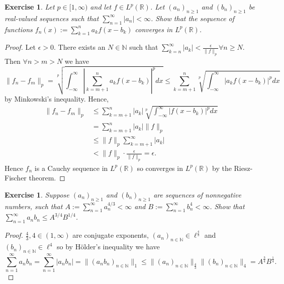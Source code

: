 \documentclass{article}
\newtheorem{exercise}[theorem]{Exercise}
\begin{document}
\begin{exercise}
Let $p \in [1, \infty)$ and let $f \in L^p(\mathbb{R})$. Let $(a_n)_{n \geq 1}$ and $(b_n)_{n \geq 1}$ be real-valued sequences such that $\sum_{n=1}^{\infty} |a_n| < \infty$. Show that the sequence of functions $f_n(x) := \sum_{k=1}^{n} a_k f(x - b_k)$ converges in $L^p(\mathbb{R})$.
\end{exercise}
\begin{proof}
Let $\epsilon >0$. There exists an $N\in\mathbb{N}$ such that $\sum_{k=n}^\infty |a_k|<\frac{\epsilon}{\|f\|_p}\forall n\geq N$. Then $\forall n>m>N$ we have\[\|f_n-f_m\|_p=\sqrt[p]{\int_{-\infty}^\infty |\sum_{k=m+1}^na_kf(x-b_k)|^pdx}\leq\sum_{k=m+1}^n\sqrt[p]{\int_{-\infty}^\infty|a_kf(x-b_k)|^pdx}\] by Minkowski's inequality. Hence,\begin{align*}\|f_n-f_m\|_p&\leq\sum_{k=m+1}^n|a_k|\sqrt[p]{\int_{-\infty}^\infty |f(x-b_k)|^pdx}\\&=\sum_{k=m+1}^n|a_k|\|f\|_p\\&\leq\|f\|_p\sum_{k=m+1}^\infty|a_k|\\&<\|f\|_p\cdot\frac{\epsilon}{\|f\|_p}=\epsilon.
\end{align*} Hence $f_n$ is a Cauchy sequence in $L^p(\mathbb{R})$ so converges in $L^p(\mathbb{R})$ by the Riesz-Fischer theorem.
\end{proof}

\begin{exercise}
Suppose $(a_n)_{n \geq 1}$ and $(b_n)_{n \geq 1}$ are sequences of nonnegative numbers, such that $A := \sum_{n=1}^{\infty} a_n^{4/3} < \infty$ and $B := \sum_{n=1}^{\infty} b_n^4 < \infty$. Show that $\sum_{n=1}^{\infty} a_n b_n \leq A^{3/4} B^{1/4}$.
\end{exercise}
\begin{proof}
$\frac{4}{3},4\in(1,\infty)$ are conjugate exponents, $(a_n)_{n\in\mathbb{N}}\in \ell^\frac{4}{3}$ and $(b_n)_{n\in\mathbb{N}}\in \ell^4$ so by H\"{o}lder's inequality we have\[\sum_{n=1}^\infty a_nb_n=\sum_{n=1}^\infty |a_nb_n|=\|(a_nb_n)_{n\in\mathbb{N}}\|_1\leq\|(a_n)_{n\in\mathbb{N}}\|_\frac{4}{3}\|(b_n)_{n\in\mathbb{N}}\|_4=A^\frac{3}{4}B^\frac{1}{4}.\]
\end{proof}
\end{document}
